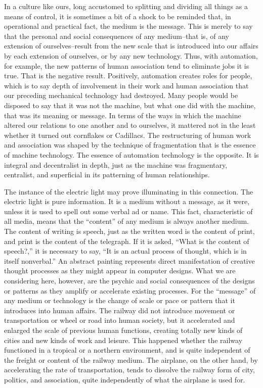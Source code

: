 \documentclass[]{book}
\theoremstyle{definition}
\theoremstyle{definition}
\theoremstyle{definition}
\theoremstyle{remark}
\begin{document}
In a culture like ours, long accustomed to splitting and dividing all
things as a means of control, it is sometimes a bit of a shock to be
reminded that, in operational and practical fact, the medium is the
message. This is merely to say that the personal and social consequences
of any medium--that is, of any extension of ourselves--result from the
new scale that is introduced into our affairs by each extension of
ourselves, or by any new technology. Thus, with automation, for example,
the new patterns of human association tend to eliminate jobs it is true.
That is the negative result. Positively, automation creates roles for
people, which is to say depth of involvement in their work and human
association that our preceding mechanical technology had destroyed. Many
people would be disposed to say that it was not the machine, but what
one did with the machine, that was its meaning or message. In terms of
the ways in which the machine altered our relations to one another and
to ourselves, it mattered not in the least whether it turned out
cornflakes or Cadillacs. The restructuring of human work and association
was shaped by the technique of fragmentation that is the essence of
machine technology. The essence of automation technology is the
opposite. It is integral and decentralist in depth, just as the machine
was fragmentary, centralist, and superficial in its patterning of human
relationships.

The instance of the electric light may prove illuminating in this
connection. The electric light is pure information. It is a medium
without a message, as it were, unless it is used to spell out some
verbal ad or name. This fact, characteristic of all media, means that
the ``content'' of any medium is always another medium. The content of
writing is speech, just as the written word is the content of print, and
print is the content of the telegraph. If it is asked, ``What is the
content of speech?,'' it is necessary to say, ``It is an actual process
of thought, which is in itself nonverbal.'' An abstract painting
represents direct manifestation of creative thought processes as they
might appear in computer designs. What we are considering here, however,
are the psychic and social consequences of the designs or patterns as
they amplify or accelerate existing processes. For the ``message'' of
any medium or technology is the change of scale or pace or pattern that
it introduces into human affairs. The railway did not introduce movement
or transportation or wheel or road into human society, but it
accelerated and enlarged the scale of previous human functions, creating
totally new kinds of cities and new kinds of work and leisure. This
happened whether the railway functioned in a tropical or a northern
environment, and is quite independent of the freight or content of the
railway medium. The airplane, on the other hand, by accelerating the
rate of transportation, tends to dissolve the railway form of city,
politics, and association, quite independently of what the airplane is
used for.
\end{document}
